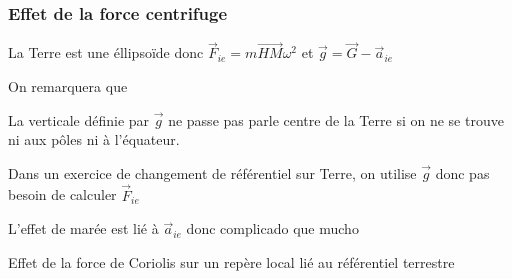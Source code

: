 \documentclass[a4paper,french,bookmarks]{book}
\begin{document}
    \subsubsection{Effet de la force centrifuge}

    La Terre est une éllipsoïde donc \(\vec F_{ie} = m \vec{HM}\omega^2\) et \(\vec g = \vec G - \vec a_{ie}\)

    On remarquera que 
    \begin{enumerate}
        \itt La verticale définie par \(\vec g\) ne passe pas parle centre de la Terre si on ne se trouve ni aux pôles ni à l'équateur.

        \itt Dans un exercice de changement de référentiel sur Terre, on utilise \(\vec g\) donc pas besoin de calculer \(\vec F_{ie}\)

        \itt L'effet de marée est lié à \(\vec a_{ie}\) donc complicado que mucho

        \itt Effet de la force de Coriolis sur un repère local lié au référentiel terrestre
    \end{enumerate}
    

    
\end{document}
